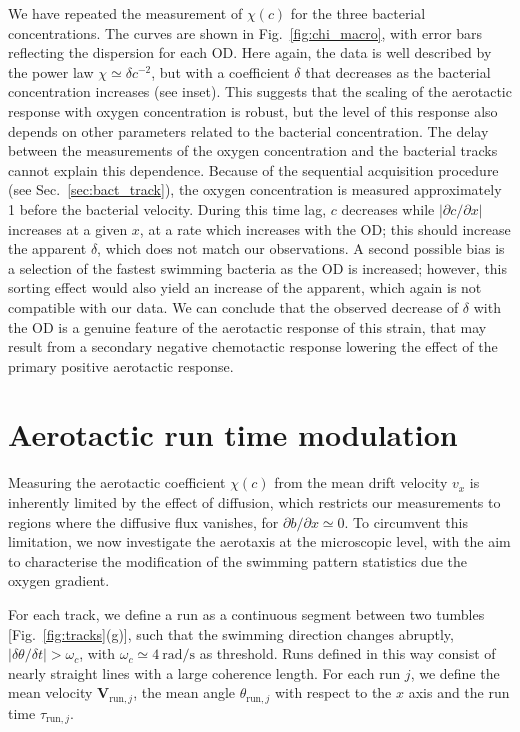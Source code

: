 \documentclass[aps,a4paper,twocolumn,10pt,pre,showpacs]{revtex4-2}
\begin{document}
We have repeated the measurement of $\chi(c)$  for the three bacterial concentrations. The curves are shown in Fig.~\ref{fig:chi_macro}, with error bars reflecting the dispersion for each OD. Here again, the data is well described by the power law $\chi \simeq \delta c^{-2}$, but with a coefficient $\delta$ that decreases as the bacterial concentration increases (see inset).  This suggests that the scaling of the aerotactic response with oxygen concentration is robust, but the level of this response also depends on other parameters related to the bacterial concentration. The delay between the measurements of the oxygen concentration and the bacterial tracks cannot explain this dependence. Because of the sequential acquisition procedure (see Sec.~\ref{sec:bact_track}), the oxygen concentration is measured approximately \SI{1}{\min} before the bacterial velocity. During this time lag, $c$ decreases while $|\partial c/\partial x|$ increases at a given $x$, at a rate which increases with the OD; this should increase the apparent $\delta$, which does not match our observations. A second possible bias is a selection of the fastest swimming bacteria as the OD is increased; however, this sorting effect would also yield an increase of the apparent, which again is not compatible with our data. We can conclude that the observed decrease of $\delta$ with the OD is a genuine feature of the aerotactic response of this strain, that may result from a secondary negative chemotactic response lowering the effect of the primary positive aerotactic response.



\section{Aerotactic run time modulation}
\label{sec:micro}

Measuring the aerotactic coefficient $\chi(c)$ from the mean drift velocity $v_x$ is inherently limited by the effect of diffusion, which restricts our measurements to regions where the diffusive flux vanishes, for $\partial b/\partial x \simeq 0$. To circumvent this limitation, we now investigate the aerotaxis at the microscopic level, with the aim to characterise the modification of the swimming pattern statistics due the oxygen gradient.


For each track, we define a run as a continuous segment between two tumbles [Fig.~\ref{fig:tracks}(g)], such that the swimming direction changes abruptly, $|\delta \theta / \delta t| > \omega_{c}$, with $\omega_c \simeq \SI{4}{\radian\per\s}$ as threshold. Runs defined in this way consist of nearly straight lines with a large coherence length. For each run $j$, we define the mean velocity $\mathbf{V}_{\mathrm{run},j}$, the mean angle $\theta_{\mathrm{run},j}$ with respect to the $x$ axis and the run time $\tau_{\mathrm{run},j}$.
\end{document}
